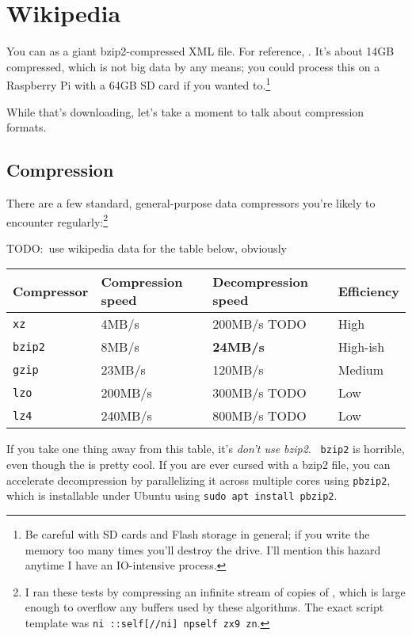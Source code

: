 \section{Wikipedia}
You can
 as a giant bzip2-compressed XML file. For
reference,
. It's about 14GB compressed, which is not
big data by any means; you could process this on a Raspberry Pi with a 64GB SD
card if you wanted to.\footnote{Be careful with SD cards and Flash storage in
general; if you write the memory too many times you'll destroy the drive. I'll
mention this hazard anytime I have an IO-intensive process.}

While that's downloading, let's take a moment to talk about compression formats.

\subsection{Compression}
There are a few standard, general-purpose data compressors you're likely to
encounter regularly:\footnote{I ran these tests by compressing an infinite
stream of copies of , which is large enough to overflow any buffers used by these
algorithms. The exact script template was {\tt ni ::self[//ni] npself zx9 zn}.}

TODO:~use wikipedia data for the table below, obviously

\begin{table}[ht]
\begin{tabular}{llll}
  Compressor  & Compression speed & Decompression speed & Efficiency \\
  \hline
  {\tt xz}    & 4MB/s             & 200MB/s TODO        & High \\
  {\tt bzip2} & 8MB/s             & {\bf 24MB/s}        & High-ish \\
  {\tt gzip}  & 23MB/s            & 120MB/s             & Medium \\
  {\tt lzo}   & 200MB/s           & 300MB/s TODO        & Low \\
  {\tt lz4}   & 240MB/s           & 800MB/s TODO        & Low
\end{tabular}
\end{table}

If you take one thing away from this table, it's {\it don't use bzip2}. {\tt
bzip2} is horrible, even though the
is pretty cool. If you are ever cursed with a bzip2 file, you can accelerate
decompression by parallelizing it across multiple cores using {\tt pbzip2},
which is installable under Ubuntu using {\tt sudo apt install pbzip2}.

